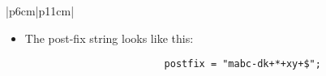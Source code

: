 \begin{center}
\begin{longtable}{ |p{6cm}|p{11cm}| }
\begin{itemize}
{\begin{center}
\begin{bytefield}{10}
                             \\
                        \end{bytefield}
                        \begin{itemize}
                            \item We check precedence again.
                        \end{itemize}
                        \begin{verbatim}
                            precedence('+','*'); // -> false
                        \end{verbatim}
                        \begin{itemize}
                            \item Since this is false, we just push it to the stack. 
                        \end{itemize}
                        \begin{tabular}{ c }
                            \texttt{OperandStack =} \\ \\
                        \end{tabular}
                        \begin{bytefield}{10}
                             \\
                        \end{bytefield}
                    \end{center}
                }
            
            \item The post-fix string looks like this:
                {
                    \begin{verbatim}
                        postfix = "mabc-dk+*+xy+$";
                    \end{verbatim}
                }
        \end{itemize}
        \\ 
        \hline
        \hline
        

\end{longtable}
\end{center}

